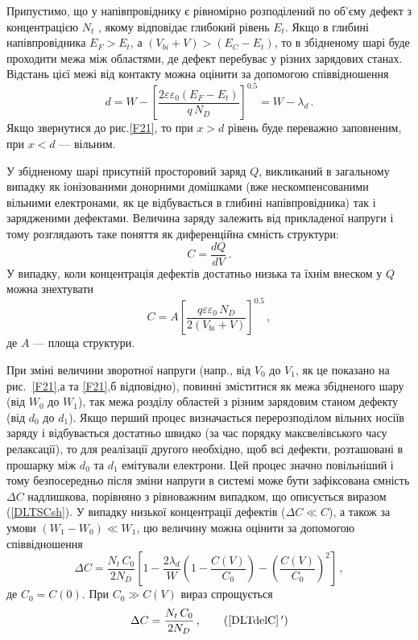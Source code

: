 Припустимо, що у напівпровіднику є рівномірно розподілений по об'єму дефект з концентрацією $N_t$ , якому
відповідає глибокий рівень $E_t$.
Якщо в глибині напівпровідника $E_F>E_t$, а $(V_{bi}+V)>(E_C-E_t)$,
то в збідненому шарі буде проходити межа між  областями, де дефект перебуває у різних зарядових станах.
Відстань цієї межі від контакту можна оцінити за допомогою співвідношення
\begin{equation}
d=W-\left[\frac{2\varepsilon\varepsilon_0(E_F-E_t)}{q\,N_D}\right]^{0.5}=W-\lambda_d\,.
\end{equation}
Якщо звернутися до рис.\ref{F21}, то при $x>d$
рівень буде переважно заповненим, при $x<d$ --- вільним.

У збідненому шарі присутній просторовий заряд $Q$, викликаний в загальному випадку
як іонізованими донорними домішками
(вже нескомпенсованими вільними електронами, як це відбувається в глибині напівпровідника)
так і зарядженими дефектами.
Величина заряду залежить від прикладеної напруги і тому розглядають таке поняття як диференційна
ємність структури:
\begin{equation}
\label{DLTSC}
C=\frac{dQ}{dV}\,.
\end{equation}
У випадку, коли концентрація дефектів достатньо низька та їхнім внеском у $Q$ можна знехтувати
\begin{equation}
\label{DLTSCsh}
C=A\left[\frac{q\varepsilon\varepsilon_0\,N_D}{2(V_{bi}+V)}\right]^{0.5}\,,
\end{equation}
де
$A$ --- площа структури.

При зміні величини зворотної напруги (напр., від $V_0$ до $V_1$,
як це показано на рис.~\ref{F21},а та \ref{F21},б відповідно),
повинні зміститися як межа збідненого шару (від $W_0$ до $W_1$),
так межа розділу областей з різним зарядовим станом дефекту (від $d_0$ до $d_1$).
Якщо перший процес визначається перерозподілом
вільних носіїв заряду і відбувається достатньо швидко (за час порядку максвелівського часу релаксації),
то для реалізації другого необхідно, щоб всі дефекти, розташовані в прошарку
між $d_0$ та $d_1$ емітували електрони.
Цей процес значно повільніший і тому безпосередньо після зміни напруги
в системі може бути зафіксована ємність $\Delta C$ надлишкова, порівняно з рівноважним випадком, що
описується виразом (\ref{DLTSCsh}).
У випадку низької концентрації дефектів ($\Delta C\ll C$), а також за умови $(W_1-W_0)\ll W_1$,
цю величину можна оцінити за допомогою співвідношення \cite{tuomisto2019}
\begin{equation}
\label{DLTdelC}
\Delta C=\frac{N_t\,C_0}{2N_D}\left[1-\frac{2\lambda_d}{W}\left(1-\frac{C(V)}{C_0}\right)-\left(\frac{C(V)}{C_0}\right)^2\right]\,,
\end{equation}
де
$C_0=C(0)$.
При $C_0\gg C(V)$ вираз спрощується
\begin{equation}
\label{DLTdelC*}
\Delta C=\frac{N_t\,C_0}{2N_D} \,,\tag{\ref{DLTdelC}\,$'$}
\end{equation}

